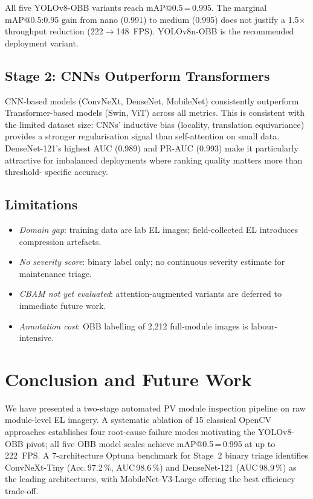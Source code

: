 \documentclass[conference]{IEEEtran}
\begin{document}
All five YOLOv8-OBB variants reach mAP@0.5\,=\,0.995.
The marginal mAP@0.5:0.95 gain from nano (0.991) to medium
(0.995) does not justify a 1.5$\times$ throughput reduction
(222$\to$148~FPS). YOLOv8n-OBB is the recommended deployment
variant.

\subsection{Stage 2: CNNs Outperform Transformers}

CNN-based models (ConvNeXt, DenseNet, MobileNet) consistently
outperform Transformer-based models (Swin, ViT) across all
metrics. This is consistent with the limited dataset size:
CNNs' inductive bias (locality, translation equivariance)
provides a stronger regularisation signal than self-attention
on small data. DenseNet-121's highest AUC (0.989) and PR-AUC
(0.993) make it particularly attractive for imbalanced
deployments where ranking quality matters more than threshold-
specific accuracy.

\subsection{Limitations}

\begin{itemize}
  \item \textit{Domain gap}: training data are lab EL images;
        field-collected EL introduces compression artefacts.
  \item \textit{No severity score}: binary label only;
        no continuous severity estimate for maintenance triage.
  \item \textit{CBAM not yet evaluated}: attention-augmented
        variants are deferred to immediate future work.
  \item \textit{Annotation cost}: OBB labelling of 2{,}212
        full-module images is labour-intensive.
\end{itemize}

\section{Conclusion and Future Work}
\label{sec:conclusion}

We have presented a two-stage automated PV module inspection
pipeline on raw module-level EL imagery.
A systematic ablation of 15 classical OpenCV approaches
establishes four root-cause failure modes motivating the
YOLOv8-OBB pivot; all five OBB model scales achieve
mAP@0.5\,=\,0.995 at up to 222~FPS.
A 7-architecture Optuna benchmark for Stage~2 binary triage
identifies ConvNeXt-Tiny (Acc.\,97.2\,\%, AUC\,98.6\,\%)
and DenseNet-121 (AUC\,98.9\,\%) as the leading architectures,
with MobileNet-V3-Large offering the best efficiency trade-off.
\end{document}
